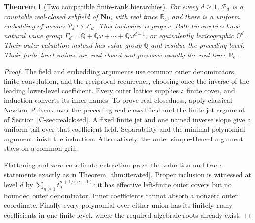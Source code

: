\documentclass[11pt,letterpaper]{article}
\numberwithin{equation}{section}
\newtheorem{theorem}{Theorem}[section]
\theoremstyle{definition}
\theoremstyle{remark}
\newcommand{\No}{\mathbf{No}}
\newcommand{\Rc}{\mathbb R_{\mathrm c}}
\newcommand{\Q}{\mathbb Q}
\begin{document}
\begin{theorem}[Two compatible finite-rank hierarchies]
\label{thm:parallel-towers}
For every $d\ge1$, $\mathcal P_d$ is a countable real-closed subfield of $\No$,
with real trace $\Rc$, and there is a uniform embedding of names
$\mathcal P_d\hookrightarrow\mathcal L_d$. This inclusion is proper.
Both hierarchies have natural value group
$\Gamma_d=\Q+\Q\omega+\cdots+\Q\omega^{d-1}$, or equivalently lexicographic
$\Q^d$. Their outer valuation instead has value group $\Q$ and residue the
preceding level. Their finite-level unions are real closed and preserve
exactly the real trace $\Rc$.
\end{theorem}
\begin{proof}
The field and embedding arguments use common outer denominators, finite
convolution, and the reciprocal recurrence, choosing once the inverse of
the leading lower-level coefficient. Every outer lattice supplies a finite
cover, and induction converts its inner names. To prove real closedness,
apply classical Newton--Puiseux over the preceding real-closed field and
the finite-jet argument of Section~\ref{C-sec:realclosed}. A fixed finite
jet and one named inverse slope give a uniform tail over that coefficient
field. Separability and the minimal-polynomial argument finish the induction.
Alternatively, the outer simple-Hensel argument stays on a common grid.

Flattening and zero-coordinate extraction prove the valuation and trace
statements exactly as in Theorem~\ref{thm:iterated}. Proper inclusion is
witnessed at level $d$ by
$\sum_{n\ge1}t_d^{n+1/(n+1)}$: it has effective left-finite outer covers but
no bounded outer denominator. Inner coefficients cannot absorb a nonzero
outer coordinate. Finally every polynomial over either union has its finitely
many coefficients in one finite level, where the required algebraic roots
already exist.
\end{proof}
\end{document}
